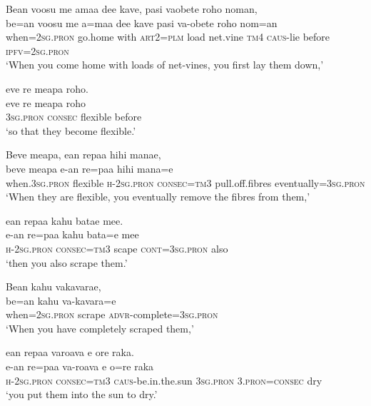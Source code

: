 \ea\label{ex:text22-41}
Bean voosu me amaa dee kave, pasi vaobete roho noman,\\
\gll be=an	voosu	me	a=maa	dee	kave	pasi	va-obete	roho	nom=an\\
     when=2\textsc{sg}.\textsc{pron}	go.home	with	\textsc{art}2=\textsc{plm}	load	net.vine	\textsc{tm}4	\textsc{caus}-lie	before	\textsc{ipfv}=2\textsc{sg}.\textsc{pron}\\
\glt `When you come home with loads of net-vines, you first lay them down,'
\z

\ea\label{ex:text22-42}
eve re meapa roho.\\
\gll eve	re	meapa	roho\\
     3\textsc{sg}.\textsc{pron}	\textsc{consec}	flexible	before\\
\glt `so that they become flexible.'
\z

\ea\label{ex:text22-43}
Beve meapa, ean repaa hihi manae,\\
\gll beve	meapa	e-an	re=paa	hihi	mana=e\\
     when.3\textsc{sg}.\textsc{pron}	flexible	\textsc{h}-2\textsc{sg}.\textsc{pron}	\textsc{consec}=\textsc{tm}3	pull.off.fibres	eventually=3\textsc{sg}.\textsc{pron}\\
\glt `When they are flexible, you eventually remove the fibres from them,'
\z

\ea\label{ex:text22-44}
ean repaa kahu batae mee.\\
\gll e-an	re=paa	kahu	bata=e	mee\\
     \textsc{h}-2\textsc{sg}.\textsc{pron}	\textsc{consec}=\textsc{tm}3	scape	\textsc{cont}=3\textsc{sg}.\textsc{pron}	also\\
\glt `then you also scrape them.'
\z

\ea\label{ex:text22-45}
Bean kahu vakavarae,\\
\gll be=an	kahu	va-kavara=e\\
     when=2\textsc{sg}.\textsc{pron}	scrape	\textsc{advr}-complete=3\textsc{sg}.\textsc{pron}\\
\glt `When you have completely scraped them,'
\z

\newpage
\ea\label{ex:text22-46}
ean repaa varoava e ore raka.\\
\gll e-an	re=paa	va-roava	e	o=re	raka\\
     \textsc{h}-2\textsc{sg}.\textsc{pron}	\textsc{consec}=\textsc{tm}3	\textsc{caus}-be.in.the.sun	3\textsc{sg}.\textsc{pron}	3.\textsc{pron}=\textsc{consec}	dry\\
\glt `you put them into the sun to dry.'
\z

